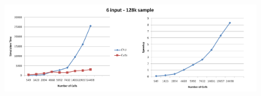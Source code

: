 \begin{figure}
\centering
\includegraphics[scale=0.3]{img/compleate5.png}
\label{img:result5}
\label{Result of the 6 input simulation}
\end{figure}
